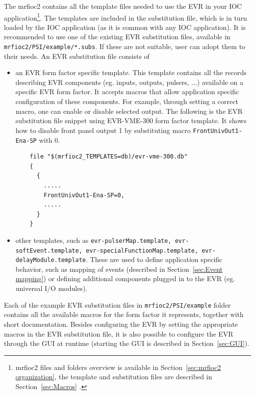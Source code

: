 \documentclass[12pt,a4paper]{article}
\begin{document}
The mrfioc2 contains all the template files needed to use the EVR in your IOC application\footnote{mrfioc2 files and folders overview is available in Section~\ref{sec:mrfioc2 organization}, the template and substitution files are described in Section~\ref{sec:Macros}
 .}. The templates are included in the substitution file, which is in turn loaded by the IOC application (as it is common with any IOC application). 
It is recommended to use one of the existing EVR substitution files, available in \texttt{mrfioc2/PSI/example/*.subs}. If these are not suitable, user can adopt them to their needs.
An EVR substitution file consists of
\begin{itemize}
	\item an EVR form factor specific template. This template contains all the records describing EVR components (eg. inputs, outputs, pulsers, ...) available on a specific EVR form factor. It accepts macros that allow application specific configuration of these components. For example, through setting a correct macro, one can enable or disable selected output. The following is the EVR substitution file snippet using EVR-VME-300 form factor template. It shows how to disable front panel output 1 by substituting macro \texttt{FrontUnivOut1-Ena-SP} with 0.
	\begin{verbatim}
	file "$(mrfioc2_TEMPLATES=db)/evr-vme-300.db"
	{
	  {
	    .....
	    FrontUnivOut1-Ena-SP=0,
	    .....
	  }
	}
	\end{verbatim}
	\item other templates, such as \texttt{evr-pulserMap.template, evr-softEvent.template, evr-specialFunctionMap.template, evr-delayModule.template}. These are used to define application specific behavior, such as mapping of events (described in Section~\ref{sec:Event mapping}) or defining additional components plugged in to the EVR (eg. universal I/O modules). 
\end{itemize}
Each of the example EVR substitution files in \texttt{mrfioc2/PSI/example} folder contains all the available macros for the form factor it represents, together with short documentation. Besides configuring the EVR by setting the appropriate macros in the EVR substitution file, it is also possible to configure the EVR through the GUI at runtime (starting the GUI is described in Section~\ref{sec:GUI}).
\end{document}
